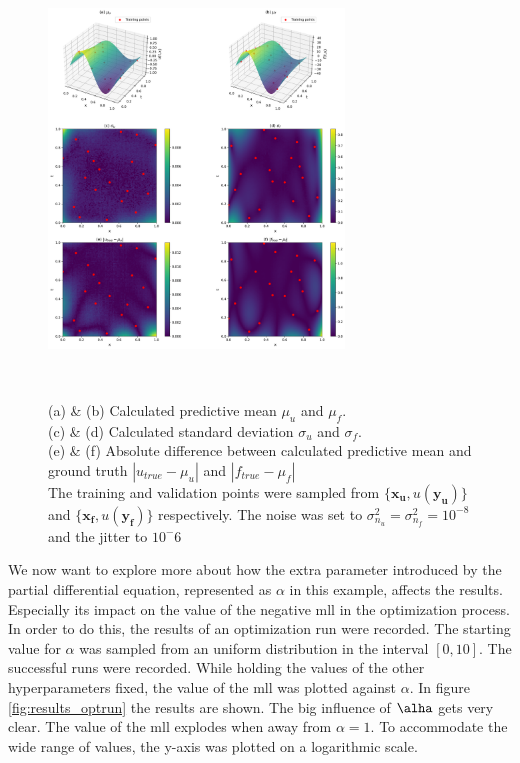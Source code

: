 \documentclass{article}
\begin{document}
\begin{figure}
    \centering
    \includegraphics[width=0.7\textwidth]{../final_examples/heat_equation/merged_plots.png}
    \caption{(a) \& (b) Calculated predictive mean $\mu_u$ and $\mu_f$.\\ 
    (c) \& (d) Calculated standard deviation $\sigma_{u}$ and $\sigma_f$.\\
    (e) \& (f) Absolute difference between calculated predictive mean and ground truth $|u_{true}-\mu_u|$ and $|f_{true}-\mu_f|$\\
    The training and validation points were sampled from $\{\bm{x_u},u(\bm{y_u})\}$ and $\{\bm{x_f},u(\bm{y_f})\}$ respectively. The noise was set to $\sigma_{n_u}^2 = \sigma_{n_f}^2 = 10^{-8}$ and the jitter to $10^-6$}
    ~\label{fig:results_heatequation}
\end{figure}
We now want to explore more about how the extra parameter introduced by the partial differential equation, represented as $\alpha$ in this example, affects the results. Especially its impact on the value of the negative mll in the optimization process. In order to do this, the results of an optimization run were recorded. The starting value for $\alpha$ was sampled from an uniform distribution in the interval $\left[0,10\right]$. The successful runs were recorded. While holding the values of the other hyperparameters fixed, the value of the mll was plotted against $\alpha$. In figure \ref{fig:results_optrun} the results are shown. The big influence of $\alha$ gets very clear. The value of the mll explodes when away from $\alpha = 1$. To accommodate the wide range of values, the y-axis was plotted on a logarithmic scale.
\end{document}
